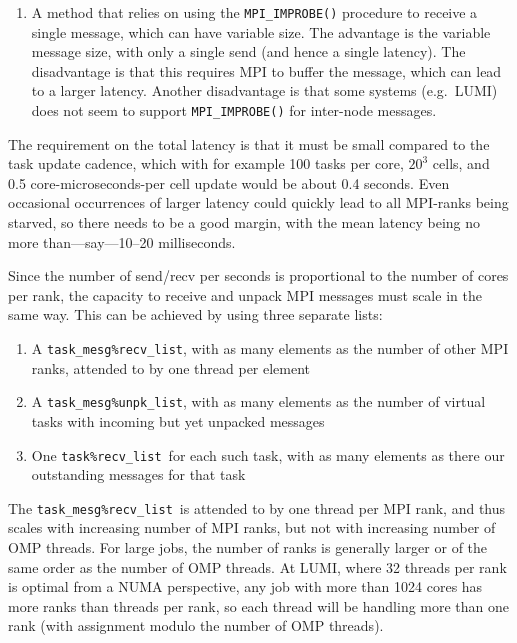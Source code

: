 \documentclass[paper=a4,fontsize=11pt]{scrartcl}
\numberwithin{equation}{section}		%
\numberwithin{figure}{section}			%
\numberwithin{table}{section}				%
\newcommand{\codecolor}{\color{Blue}}
\newcommand{\Code}[1]{{\codecolor\texttt{#1}}}
\begin{document}
\begin{enumerate}
    \item A method that relies on using the \Code{MPI\_IMPROBE()} procedure to receive a single message, which can have variable size.  The advantage is the variable message size, with only a single send (and hence a single latency).  The disadvantage is that this requires MPI to buffer the message, which can lead to a larger latency.  Another disadvantage is that some systems (e.g.\ LUMI) does not seem to support \Code{MPI\_IMPROBE()} for inter-node messages.
\end{enumerate}
\def\mesgrecvlist{\Code{task\_mesg\%recv\_list}}
\def\recvlist{\Code{task\%recv\_list}}
\def\unpklist{\Code{task\_mesg\%unpk\_list}}
\def\mesgt{\Code{mesg\_t}}

The requirement on the total latency is that it must be small compared to the task update cadence, which with for example 100 tasks per core, $20^3$ cells, and 0.5 core-microseconds-per cell update would be about 0.4 seconds.  Even occasional occurrences of larger latency could quickly lead to all MPI-ranks being starved, so there needs to be a good margin, with the mean latency being no more than---say---10--20 milliseconds.

Since the number of send/recv per seconds is proportional to the number of cores per rank, the capacity to receive and unpack MPI messages must scale in the same way.  This can be achieved by using three separate lists:
\begin{enumerate}
    \item A \mesgrecvlist, with as many elements as the number of other MPI ranks, attended to by one thread per element
    \item A \unpklist, with as many elements as the number of virtual tasks with incoming but yet unpacked messages
    \item One \recvlist\ for each such task, with as many elements as there our outstanding messages for that task
\end{enumerate}

The \mesgrecvlist\ is attended to by one thread per MPI rank, and thus scales with increasing number of MPI ranks, but not with increasing number of OMP threads.  For large jobs, the number of ranks is generally larger or of the same order as the number of OMP threads.  At LUMI, where 32 threads per rank is optimal from a NUMA perspective, any job with more than 1024 cores has more ranks than threads per rank, so each thread will be handling more than one rank (with assignment modulo the number of OMP threads).
\end{document}
